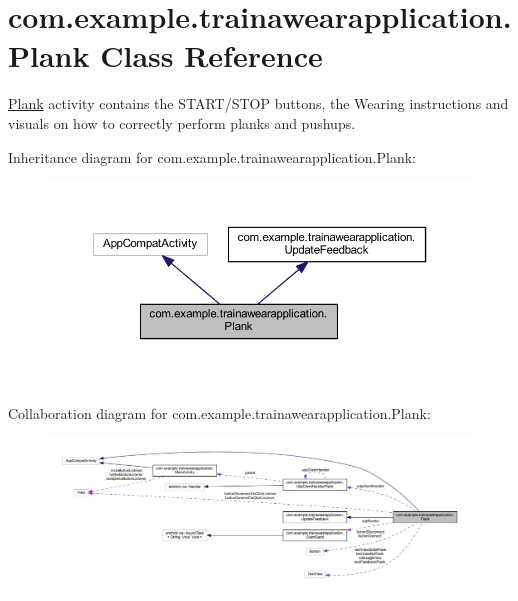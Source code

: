 \hypertarget{classcom_1_1example_1_1trainawearapplication_1_1_plank}{}\section{com.\+example.\+trainawearapplication.\+Plank Class Reference}
\label{classcom_1_1example_1_1trainawearapplication_1_1_plank}


\mbox{\hyperlink{classcom_1_1example_1_1trainawearapplication_1_1_plank}{Plank}} activity contains the S\+T\+A\+R\+T/\+S\+T\+OP buttons, the Wearing instructions and visuals on how to correctly perform planks and pushups.  




Inheritance diagram for com.\+example.\+trainawearapplication.\+Plank\+:
\nopagebreak
\begin{figure}[H]
\begin{center}
\leavevmode
\includegraphics[width=350pt]{classcom_1_1example_1_1trainawearapplication_1_1_plank__inherit__graph}
\end{center}
\end{figure}


Collaboration diagram for com.\+example.\+trainawearapplication.\+Plank\+:
\nopagebreak
\begin{figure}[H]
\begin{center}
\leavevmode
\includegraphics[width=350pt]{classcom_1_1example_1_1trainawearapplication_1_1_plank__coll__graph}
\end{center}
\end{figure}

